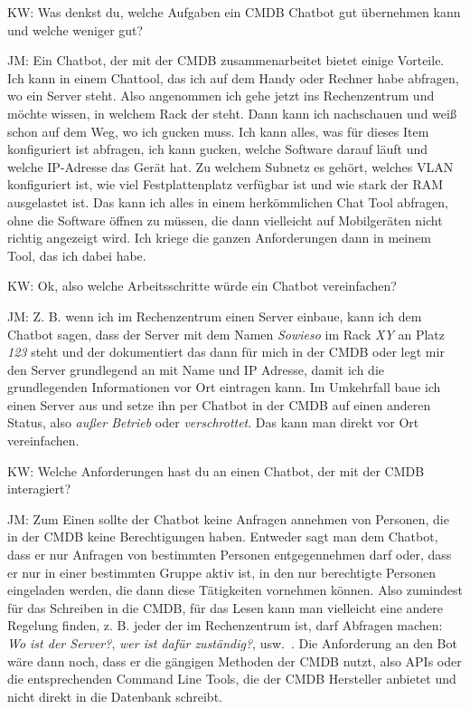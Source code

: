 \begin{list}{X:}{\setlength{\labelsep}{5mm}}
\item[KW:] Was denkst du, welche Aufgaben ein CMDB Chatbot gut übernehmen kann und welche weniger gut?
\item[JM:] Ein Chatbot, der mit der CMDB zusammenarbeitet bietet einige Vorteile. Ich kann in einem Chattool, das ich auf dem Handy oder Rechner habe abfragen, wo ein Server steht. Also angenommen ich gehe jetzt ins Rechenzentrum und möchte wissen, in welchem Rack der steht. Dann kann ich nachschauen und weiß schon auf dem Weg, wo ich gucken muss. Ich kann alles, was für dieses Item konfiguriert ist abfragen, ich kann gucken, welche Software darauf läuft und welche IP-Adresse das Gerät hat. Zu welchem Subnetz es gehört, welches VLAN konfiguriert ist, wie viel Festplattenplatz verfügbar ist und wie stark der RAM ausgelastet ist. Das kann ich alles in einem herkömmlichen Chat Tool abfragen, ohne die Software öffnen zu müssen, die dann vielleicht auf Mobilgeräten nicht richtig angezeigt wird. Ich kriege die ganzen Anforderungen dann in meinem Tool, das ich dabei habe.
\item[KW:] Ok, also welche Arbeitsschritte würde ein Chatbot vereinfachen?
\item[JM:] Z. B. wenn ich im Rechenzentrum einen Server einbaue, kann ich dem Chatbot sagen, dass der Server mit dem Namen \textit{Sowieso} im Rack \textit{XY} an Platz \textit{123} steht und der dokumentiert das dann für mich in der CMDB oder legt mir den Server grundlegend an mit Name und IP Adresse, damit ich die grundlegenden Informationen vor Ort eintragen kann. Im Umkehrfall baue ich einen Server aus und setze ihn per Chatbot in der CMDB auf einen anderen Status, also \textit{außer Betrieb} oder \textit{verschrottet}. Das kann man direkt vor Ort vereinfachen.
\item[KW:] Welche Anforderungen hast du an einen Chatbot, der mit der CMDB interagiert?
\item[JM:] Zum Einen sollte der Chatbot keine Anfragen annehmen von Personen, die in der CMDB keine Berechtigungen haben. Entweder sagt man dem Chatbot, dass er nur Anfragen von bestimmten Personen entgegennehmen darf oder, dass er nur in einer bestimmten Gruppe aktiv ist, in den nur berechtigte Personen eingeladen werden, die dann diese Tätigkeiten vornehmen können. Also zumindest für das Schreiben in die CMDB, für das Lesen kann man vielleicht eine andere Regelung finden, z. B. jeder der im Rechenzentrum ist, darf Abfragen machen: \textit{Wo ist der Server?}, \textit{wer ist dafür zuständig?}, usw.~. Die Anforderung an den Bot wäre dann noch, dass er die gängigen Methoden der CMDB nutzt, also APIs oder die entsprechenden Command Line Tools, die der CMDB Hersteller anbietet und nicht direkt in die Datenbank schreibt.

\end{list}
